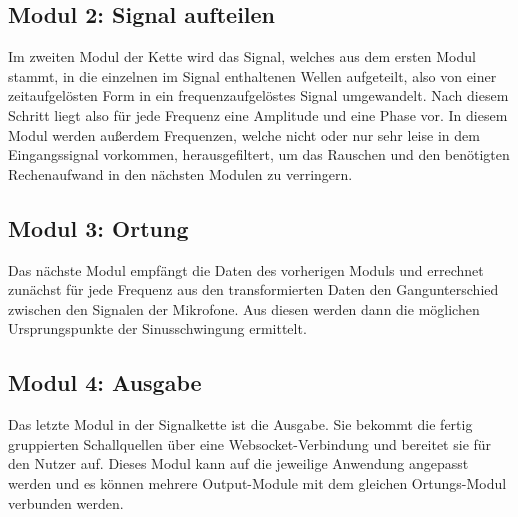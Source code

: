 \subsection{Modul 2: Signal aufteilen}
Im zweiten Modul der Kette wird das Signal, welches aus dem ersten Modul stammt, in die einzelnen im Signal enthaltenen Wellen aufgeteilt, also von einer zeitaufgelösten Form in ein frequenzaufgelöstes Signal umgewandelt. Nach diesem Schritt liegt also für jede Frequenz eine Amplitude und eine Phase vor. In diesem Modul werden außerdem Frequenzen, welche nicht oder nur sehr leise in dem Eingangssignal vorkommen, herausgefiltert, um das Rauschen und den benötigten Rechenaufwand in den nächsten Modulen zu verringern.\\

\subsection{Modul 3: Ortung}
Das nächste Modul empfängt die Daten des vorherigen Moduls und errechnet zunächst für jede Frequenz aus den transformierten Daten den Gangunterschied zwischen den Signalen der Mikrofone. Aus diesen werden dann die möglichen Ursprungspunkte der Sinusschwingung ermittelt.

\subsection{Modul 4: Ausgabe}
Das letzte Modul in der Signalkette ist die Ausgabe. Sie bekommt die fertig gruppierten Schallquellen über eine Websocket-Verbindung und bereitet sie für den Nutzer auf. Dieses Modul kann auf die jeweilige Anwendung angepasst werden und es können mehrere Output-Module mit dem gleichen Ortungs-Modul verbunden werden.